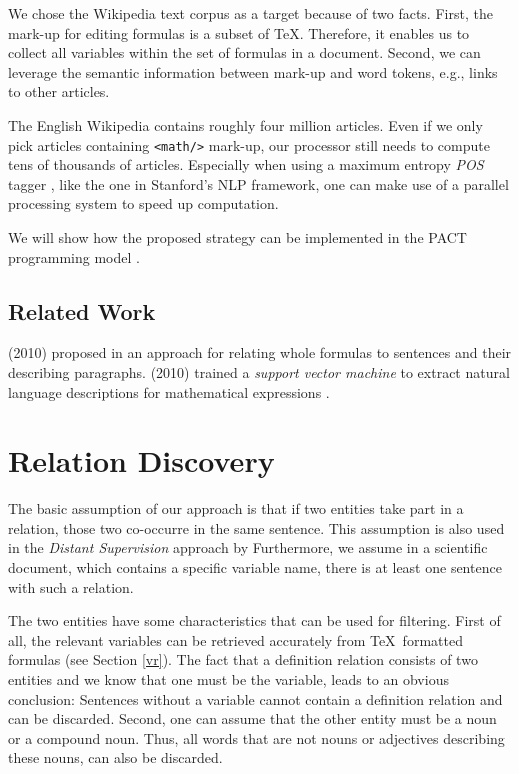 \documentclass[runningheads]{llncs}
\begin{document}
We chose the Wikipedia text corpus as a target because of two facts. First, the mark-up for editing formulas is a subset of \TeX. Therefore, it enables us to collect all variables within the set of formulas in a document. Second, we can leverage the semantic information between mark-up and word tokens, e.g., links to other articles.

The English Wikipedia contains roughly four million articles. Even if we only pick articles containing \texttt{<math/>} mark-up, our processor still needs to compute tens of thousands of articles. Especially when using a maximum entropy \emph{POS} tagger \cite{Rathna96}, like the one in Stanford's NLP framework, one can make use of a parallel processing system to speed up computation.

We will show how the proposed strategy can be implemented in the PACT programming model \cite{Alexandrov2010}.


\subsection{Related Work}
\citeauthor{Quoc2010} (2010) proposed in \cite{Quoc2010} an approach for relating whole formulas to sentences and their describing paragraphs. \citeauthor{Yokoi} (2010) trained a \emph{support vector machine} to extract natural language descriptions for mathematical expressions \cite{Yokoi}.


\section{Relation Discovery}
The basic assumption of our approach is that if two entities take part in a relation, those two co-occurre in the same sentence. This assumption is also used in the \emph{Distant Supervision} \cite{Mintz2008} approach by \citeauthor{Mintz2008} Furthermore, we assume in a scientific document, which contains a specific variable name, there is at least one sentence with such a relation.

The two entities have some characteristics that can be used for filtering. First of all, the relevant variables can be retrieved accurately from \TeX\ formatted formulas (see Section \ref{vr}). The fact that a definition relation consists of two entities and we know that one must be the variable, leads to an obvious conclusion: Sentences without a variable cannot contain a definition relation and can be discarded.
Second, one can assume that the other entity must be a noun or a compound noun. Thus, all words that are not nouns or adjectives describing these nouns, can also be discarded.
\end{document}
